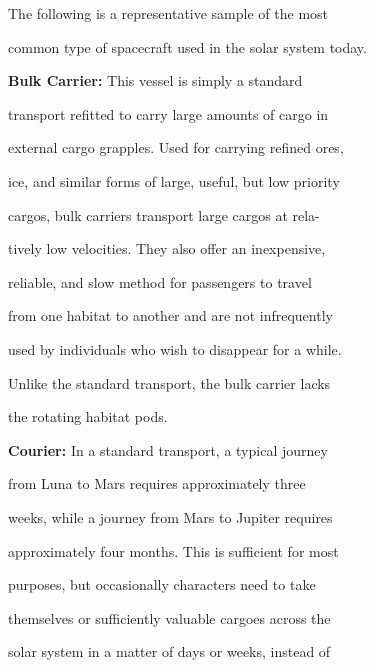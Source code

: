 The following is a representative sample of the most 

common type of spacecraft used in the solar system today.

\textbf{Bulk Carrier: }This vessel is simply a standard 

transport refitted to carry large amounts of cargo in 

external cargo grapples. Used for carrying refined ores, 

ice, and similar forms of large, useful, but low priority 

cargos, bulk carriers transport large cargos at rela-

tively low velocities. They also offer an inexpensive, 

reliable, and slow method for passengers to travel 

from one habitat to another and are not infrequently 

used by individuals who wish to disappear for a while. 

Unlike the standard transport, the bulk carrier lacks 

the rotating habitat pods.

\textbf{Courier:} In a standard transport, a typical journey 

from Luna to Mars requires approximately three 

weeks, while a journey from Mars to Jupiter requires 

approximately four months. This is sufficient for most 

purposes, but occasionally characters need to take 

themselves or sufficiently valuable cargoes across the 

solar system in a matter of days or weeks, instead of 

